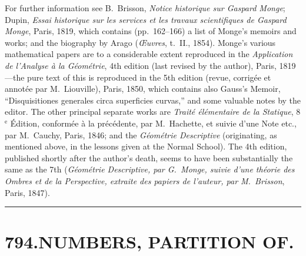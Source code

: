 \documentclass[11pt,a4paper]{book}
\begin{document}
For further information see B.\ Brisson, \textit{Notice historique sur Gaspard Monge}; Dupin, \textit{Essai historique sur les services et les travaux scientifiques de Gaspard Monge}, Paris, 1819, which contains (pp.~162--166) a list of Monge's memoirs and works; and the biography by Arago (\textit{\OE uvres}, t.~II., 1854). Monge's various mathematical papers are to a considerable extent reproduced in the \textit{Application de l'Analyse \`a la G\'eom\'etrie}, 4th edition (last revised by the author), Paris, 1819---the pure text of this is reproduced in the 5th edition (revue, corrig\'ee et annot\'ee par M.\ Liouville), Paris, 1850, which contains also Gauss's Memoir, ``Disquisitiones generales circa superficies curvas,'' and some valuable notes by the editor. The other principal separate works are \textit{Trait\'e \'el\'ementaire de la Statique}, 8$^{\text{e}}$ \'Edition, conform\'ee \`a la pr\'ec\'edente, par M.\ Hachette, et suivie d'une Note etc., par M.\ Cauchy, Paris, 1846; and the \textit{G\'eom\'etrie Descriptive} (originating, as mentioned above, in the lessons given at the Normal School). The 4th edition, published shortly after the author's death, seems to have been substantially the same as the 7th (\textit{G\'eom\'etrie Descriptive, par G.\ Monge, suivie d'une th\'eorie des Ombres et de la Perspective, extraite des papiers de l'auteur, par M.\ Brisson}, Paris, 1847).

\vspace{1em}
\hrule
\vspace{1em}



\section*{794.\quad NUMBERS, PARTITION OF.}


\smallskip
\end{document}
